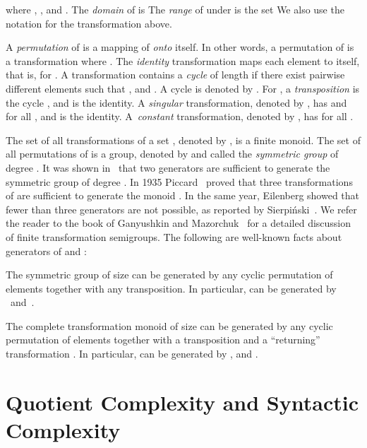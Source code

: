 \documentclass{llncs}
\begin{document}
where ,  , and . The {\em domain}  of  is 
The {\em range}  of  under  is the set
 We also use the notation  for the transformation  above. 

A \emph{permutation} of  is a mapping of  \emph{onto} itself. In other words,  a permutation  of  is a transformation where . 
The \emph{identity} transformation maps each element to itself, that is,  for .
A transformation  contains a \emph{cycle} of length  if there exist pairwise different elements  such that
, and .
A cycle is denoted by .
For , a \emph{transposition} is the cycle , and  is the identity.
A \emph{singular} transformation, denoted by , has  and  for all , and  is the identity.
A~\emph{constant} transformation,  denoted by , has  for all .

The set of all transformations of a set , denoted by , is a finite monoid. The set of all permutations of  is a group, denoted by  and called the \emph{symmetric group} of degree . 
It was shown in~\cite{Hoy1895,Pic38} that two generators are sufficient to generate the symmetric group of degree . 
In 1935 Piccard~\cite{Pic35} proved that three transformations of  are sufficient to generate the monoid . In the same year, Eilenberg showed that fewer than three generators are not possible, as reported by Sierpi\'nski~\cite{Sie35}. We refer the reader to the book of Ganyushkin and Mazorchuk~\cite{GaMa09} for a detailed discussion of finite transformation semigroups. The following are well-known facts about generators of  and : 

\begin{theorem}
\label{thm:piccard}
The symmetric group  of size  can be generated by any cyclic
permutation of  elements together with any transposition. In particular,  can be generated by
~and~.
\end{theorem}

\begin{theorem}
\label{thm:salomaa}
The complete transformation monoid  of size  can be generated by any cyclic
permutation of  elements together with a transposition and a ``returning'' transformation . In particular,  can be generated by ,   and .
\end{theorem}


\section{Quotient Complexity and Syntactic Complexity}\label{sec:complexity} 
\end{document}
